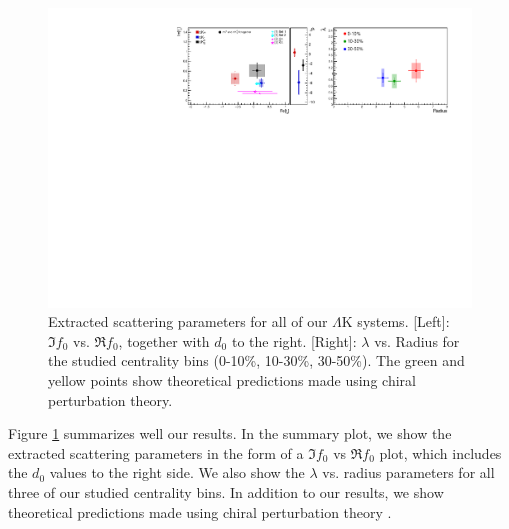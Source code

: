 \documentclass[ALICE,manyauthors]{cernphprep}
\begin{document}
\begin{figure}[h]
  \centering
  \includegraphics[width=\textwidth]{./Comp3An_Triple.pdf}
  \caption[Extracted Scattering Parameters]{Extracted scattering parameters for all of our $\Lambda$K systems.  [Left]: $\Im f_{0}$ vs. $\Re f_{0}$, together with $d_{0}$ to the right.  [Right]: $\lambda$ vs. Radius for the studied centrality bins (0-10\%, 10-30\%, 30-50\%).  The green \cite{Liu:2006xja} and yellow \cite{Mai:2009ce} points show theoretical predictions made using chiral perturbation theory.}
  \label{fig:ScattParams_3Res}
\end{figure}

Figure \ref{fig:ScattParams_3Res} summarizes well our results.
In the summary plot, we show the extracted scattering parameters in the form of a $\Im f_{0}$ vs $\Re f_{0}$ plot, which includes the $d_{0}$ values to the right side.  
We also show the $\lambda$ vs. radius parameters for all three of our studied centrality bins. 
In addition to our results, we show theoretical predictions made using chiral perturbation theory \cite{Liu:2006xja,Mai:2009ce}.
\end{document}
